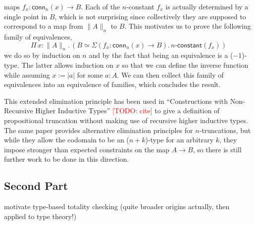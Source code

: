 \documentclass{book}
\newcommand{\TODO}[1]{\textcolor{red}{[TODO: #1]}}
\newcommand{\tr}[2]{\| #2 \|_{#1}}
\newcommand{\trcon}[1]{| #1 |}
\newcommand{\conn}{\mathsf{conn}}
\newcommand{\sd}{.\,}
\begin{document}
maps $f_x : \conn_n(x) \to B$. Each of the $n$-constant $f_x$ is actually
determined by a single point in $B$, which is not surprising since
collectively they are supposed to correspond to a map from
$\tr{n}{A}$ to $B$. This motivates us to prove the following family of equivalences,
\[
\Pi\,x : \tr{n}{A}\sd (B \simeq \Sigma (f_x : \conn_n(x) \to B)\sd\textsf{$n$-constant}(f_x))
\]
we do so by induction on $n$ and by the fact that being an equivalence
is a ($-1$)-type. The latter allows induction on $x$ so that we can
define the inverse function while assuming $x := \trcon{a}$ for some
$a : A$.
We can then collect this
family of equivalences into an equivalence of families, which
concludes the result.

This extended elimination principle has been used in ``Constructions
with Non-Recursive Higher Inductive Types'' \TODO{cite} to give a
definition of propositional truncation without making use of recursive
higher inductive types. The same paper provides alternative
elimination principles for $n$-truncations, but while they allow the
codomain to be an ($n{+}k$)-type for an arbitrary $k$, they impose
stronger than expected constraints on the map $A \to B$, so there is
still further work to be done in this direction.



\subsection{Second Part}

motivate type-based totality checking (quite broader origins actually, then applied to type theory!)
\end{document}
